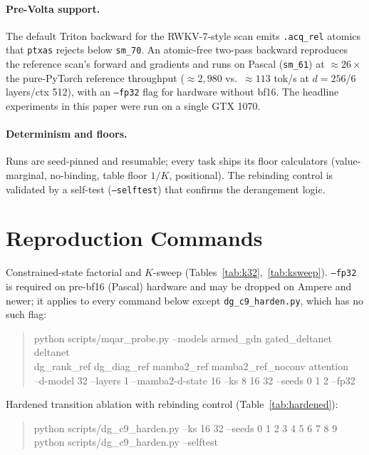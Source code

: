 \documentclass{article}
\begin{document}
\paragraph{Pre-Volta support.} The default Triton backward for the RWKV-7-style scan emits \texttt{.acq\_rel} atomics that \texttt{ptxas} rejects below \texttt{sm\_70}. An atomic-free two-pass backward reproduces the reference scan's forward and gradients and runs on Pascal (\texttt{sm\_61}) at ${\approx}26\times$ the pure-PyTorch reference throughput (${\approx}2{,}980$ vs.\ ${\approx}113$ tok/s at $d{=}256$/6 layers/ctx 512), with an \texttt{--fp32} flag for hardware without bf16. The headline experiments in this paper were run on a single GTX 1070.

\paragraph{Determinism and floors.} Runs are seed-pinned and resumable; every task ships its floor calculators (value-marginal, no-binding, table floor $1/K$, positional). The rebinding control is validated by a self-test (\texttt{--selftest}) that confirms the derangement logic.

\section{Reproduction Commands}\label{app:commands}

Constrained-state factorial and $K$-sweep (Tables~\ref{tab:k32},~\ref{tab:ksweep}). \texttt{--fp32} is required on pre-bf16 (Pascal) hardware and may be dropped on Ampere and newer; it applies to every command below except \texttt{dg\_c9\_harden.py}, which has no such flag:
\begin{quote}\small\ttfamily
python scripts/mqar\_probe.py --models armed\_gdn gated\_deltanet deltanet \\
\hspace*{1.5em}dg\_rank\_ref dg\_diag\_ref mamba2\_ref mamba2\_ref\_noconv attention \\
\hspace*{1.5em}--d-model 32 --layers 1 --mamba2-d-state 16 --ks 8 16 32 --seeds 0 1 2 --fp32
\end{quote}

Hardened transition ablation with rebinding control (Table~\ref{tab:hardened}):
\begin{quote}\small\ttfamily
python scripts/dg\_c9\_harden.py --ks 16 32 --seeds 0 1 2 3 4 5 6 7 8 9 \\
python scripts/dg\_c9\_harden.py --selftest
\end{quote}
\end{document}

